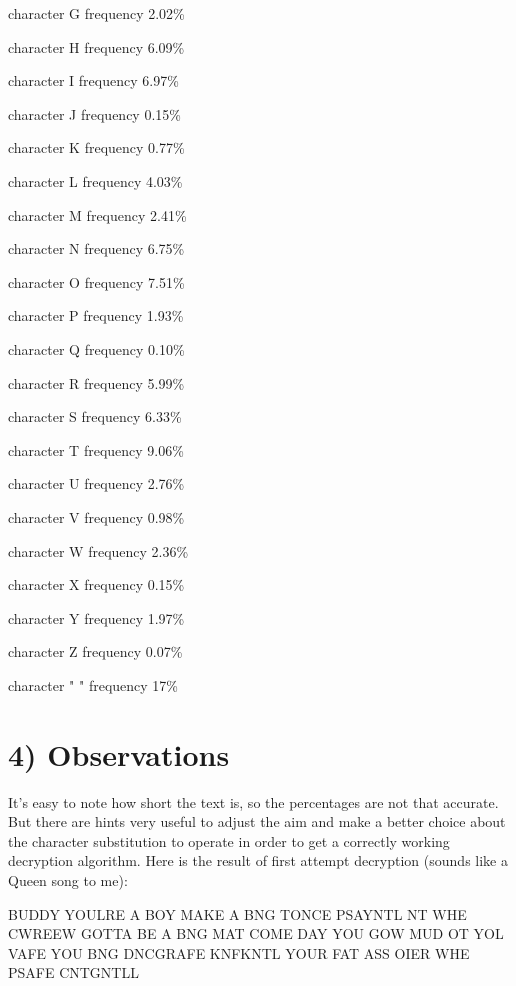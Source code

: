 \documentclass{article}
\begin{document}
character G frequency 2.02\%

character H frequency 6.09\%

character I frequency 6.97\%

character J frequency 0.15\%

character K frequency 0.77\%

character L frequency 4.03\%

character M frequency 2.41\%

character N frequency 6.75\%

character O frequency 7.51\%

character P frequency 1.93\%

character Q frequency 0.10\%

character R frequency 5.99\%

character S frequency 6.33\%

character T frequency 9.06\%

character U frequency 2.76\%

character V frequency 0.98\%

character W frequency 2.36\%

character X frequency 0.15\%

character Y frequency 1.97\%

character Z frequency 0.07\%

character " " frequency 17\%



\section*{4) Observations}
It's easy to note how short the text is, so the percentages are not that accurate. But there are hints very useful to adjust the aim and make a better choice about the character substitution to operate in order to get a correctly working decryption algorithm. Here is the result of first attempt decryption (sounds like a Queen song to me):\\ 

\begin{tcolorbox} [title=plaintext.txt]
BUDDY YOULRE A BOY MAKE A BNG TONCE PSAYNTL NT WHE CWREEW GOTTA BE A BNG MAT COME DAY YOU GOW MUD OT YOL VAFE YOU BNG DNCGRAFE KNFKNTL YOUR FAT ASS OIER WHE PSAFE CNTGNTLL
\end{tcolorbox}
\end{document}
